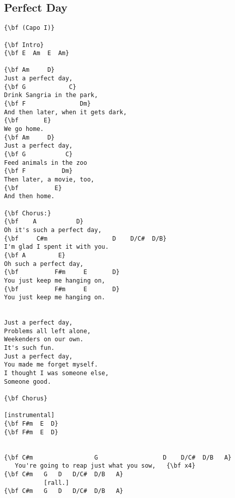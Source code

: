 \documentclass[a4paper]{article}
\begin{document}
\subsection{Perfect Day} %
\label{sub:Perfect Day}
\begin{Verbatim}[commandchars=\\\{\}]
{\bf (Capo I)}

{\bf Intro}
{\bf E  Am  E  Am}

{\bf Am     D}
Just a perfect day,
{\bf G            C}
Drink Sangria in the park,
{\bf F               Dm}
And then later, when it gets dark, 
{\bf       E}
We go home.
{\bf Am     D}
Just a perfect day,
{\bf G           C}
Feed animals in the zoo
{\bf F          Dm}
Then later, a movie, too,
{\bf          E}
And then home.

{\bf Chorus:}
{\bf    A           D}
Oh it's such a perfect day, 
{\bf     C#m                  D    D/C#  D/B}
I'm glad I spent it with you.
{\bf A         E}
Oh such a perfect day,
{\bf          F#m     E       D}
You just keep me hanging on,
{\bf          F#m     E       D}
You just keep me hanging on.


Just a perfect day,
Problems all left alone,
Weekenders on our own.
It's such fun.
Just a perfect day,
You made me forget myself.
I thought I was someone else,
Someone good.

{\bf Chorus}

[instrumental]
{\bf F#m  E  D}
{\bf F#m  E  D}


{\bf C#m                 G                  D    D/C#  D/B   A}
   You're going to reap just what you sow,   {\bf x4}
{\bf C#m   G   D   D/C#  D/B   A}
           [rall.]
{\bf C#m   G   D   D/C#  D/B   A}
\end{Verbatim}
\newpage
\end{document}
